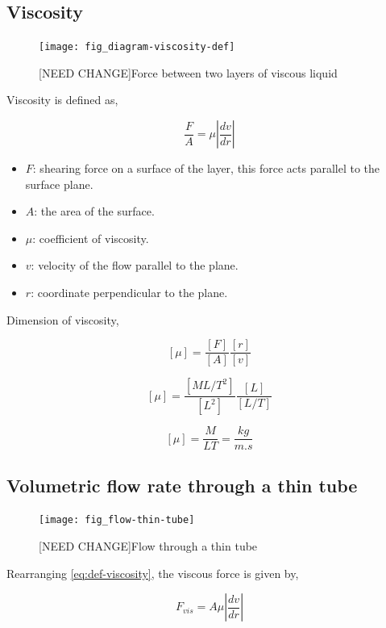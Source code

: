 \subsection{Viscosity}
	\begin{figure}[H]
		\texttt{[image: fig\_diagram-viscosity-def]}
		\caption{[NEED CHANGE]Force between two layers of viscous liquid}
		\label{fig_diagram-viscosity-def}
	\end{figure}
	
	Viscosity is defined as,
	
	\begin{equation} \label{eq:def-viscosity}
		\frac{F}{A} = \mu \left| \frac{dv}{dr} \right|
	\end{equation}
	
	\begin{itemize}
		\item $F$: shearing force on a surface of the layer, this force acts parallel to the surface plane.
		\item $A$: the area of the surface.
		\item $\mu$: coefficient of viscosity.
		\item $v$: velocity of the flow parallel to the plane.
		\item $r$: coordinate perpendicular to the plane.
	\end{itemize}
	
	Dimension of viscosity,
	
	\[ [\mu] = \frac{[F]}{[A]} \frac{[r]}{[v]} \]
	
	\[ [\mu] = \frac{[ML/T^2]}{[L^2]} \frac{[L]}{[L/T]} \]
	
	\begin{equation} \label{eq:diamension-mu}
		[\mu] = \frac{M}{LT} = \frac{kg}{m.s}
	\end{equation}


\subsection{Volumetric flow rate through a thin tube}
	
	\begin{figure}[H]
		\texttt{[image: fig\_flow-thin-tube]}
		\caption{[NEED CHANGE]Flow through a thin tube}
		\label{fig_flow-thin-tube}
	\end{figure}
	
	Rearranging \ref{eq:def-viscosity}, the viscous force is given by,
	
	\begin{equation} \label{eq:force-viscous}
		F_{vis} = A \mu \left| \frac{dv}{dr} \right|
	\end{equation}
	

